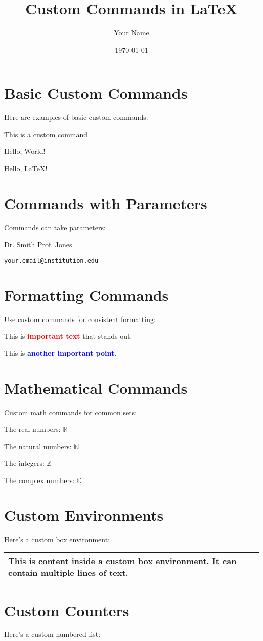 \documentclass{article}
\title{Custom Commands in LaTeX}
\author{Your Name}
\date{\today}
\newcommand{\mycommand}{This is a custom command}
\newcommand{\greeting}[1]{Hello, #1!}
\newcommand{\highlight}[1]{\textcolor{red}{\textbf{#1}}}
\newcommand{\important}[1]{\textcolor{blue}{\textbf{#1}}}
\newcommand{\person}[2][Dr.]{#1 #2}
\newcommand{\email}[1]{\texttt{#1}}
\newcommand{\R}{\mathbb{R}}
\newcommand{\N}{\mathbb{N}}
\newcommand{\Z}{\mathbb{Z}}
\newcommand{\C}{\mathbb{C}}
\newenvironment{mybox}
{\begin{center}\begin{tabular}{|p{0.8\textwidth}|}\hline}
{\\\hline\end{tabular}\end{center}}
\begin{document}
\maketitle

\section{Basic Custom Commands}
Here are examples of basic custom commands:

\mycommand

\greeting{World}

\greeting{LaTeX}

\section{Commands with Parameters}
Commands can take parameters:

\person{Smith} %
\person[Prof.]{Jones} %

\email{your.email@institution.edu}

\section{Formatting Commands}
Use custom commands for consistent formatting:

This is \highlight{important text} that stands out.

This is \important{another important point}.

\section{Mathematical Commands}
Custom math commands for common sets:

The real numbers: $\R$

The natural numbers: $\N$

The integers: $\Z$

The complex numbers: $\C$

\section{Custom Environments}
Here's a custom box environment:

\begin{mybox}
This is content inside a custom box environment.
It can contain multiple lines of text.
\end{mybox}

\section{Custom Counters}
Here's a custom numbered list:
\end{document}
